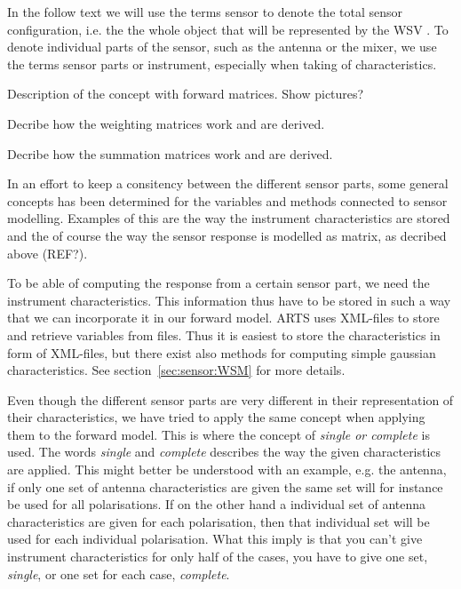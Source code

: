 In the follow text we will use the terms sensor to denote the total
sensor configuration, i.e. the the whole object that will be
represented by the WSV . To denote 
individual parts of the sensor, such as the antenna or the mixer, we
use the terms sensor parts or instrument, especially when taking
of characteristics.

Description of the concept with forward matrices. Show pictures?

Decribe how the weighting matrices work and are derived.

Decribe how the summation matrices work and are derived.


In an effort to keep a consitency between the different sensor parts, 
some general concepts has been determined for the variables and 
methods connected to sensor modelling.
Examples of this are the way the instrument characteristics are 
stored and the of course the way the sensor response is modelled 
as matrix, as decribed above (REF?).

To be able of computing the response from a certain sensor part, we 
need the instrument characteristics. This information thus have to 
be stored in such a way that we can incorporate it in our forward 
model. ARTS uses XML-files to store and retrieve variables from 
files. Thus it is easiest to store the characteristics in form of 
XML-files, but there exist also methods for computing simple gaussian
characteristics. See section~\ref{sec:sensor:WSM} for more details.

Even though the different sensor parts are very different in their
representation of their characteristics, we have tried to apply the 
same concept when applying them to the forward model. This is where
the concept of \textit{single or complete} is used. The words 
\textit{single} and \textit{complete} describes the way the given 
characteristics are applied. This might better be understood with an
example, e.g. the antenna, if only one set of antenna characteristics
are given the same set will for instance be used for all polarisations.
If on the other hand a individual set of antenna characteristics are 
given for each polarisation, then that individual set will be used
for each individual polarisation.
What this imply is that you can't give instrument characteristics
for only half of the cases, you have to give one set, \textit{single},
or one set for each case, \textit{complete}.

